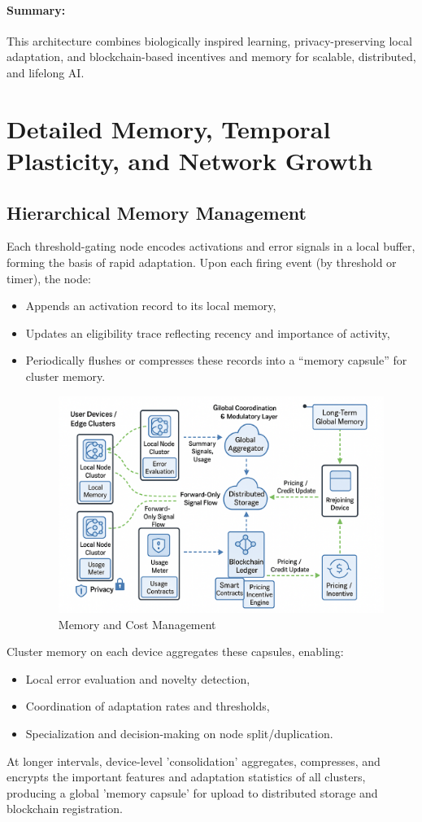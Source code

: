 \documentclass[11pt]{article}
\begin{document}
\paragraph{Summary:}  
This architecture combines biologically inspired learning, privacy-preserving local adaptation, and blockchain-based incentives and memory for scalable, distributed, and lifelong AI.


\section{Detailed Memory, Temporal Plasticity, and Network Growth}

\subsection{Hierarchical Memory Management}
Each threshold-gating node encodes activations and error signals in a local buffer, forming the basis of rapid adaptation. Upon each firing event (by threshold or timer), the node:
\begin{itemize}
    \item Appends an activation record to its local memory,
    \item Updates an eligibility trace reflecting recency and importance of activity,
    \item Periodically flushes or compresses these records into a “memory capsule” for cluster memory.
    \begin{figure}
        \centering
        \includegraphics[width=0.6\linewidth]{architecture_diagrams/37f16f0b-ac7a-44b5-8a94-e48c92587896.png}
        \caption{Memory and Cost Management}
        \label{fig:memory-and-cost-management}
    \end{figure}
\end{itemize}
Cluster memory on each device aggregates these capsules, enabling:
\begin{itemize}
    \item Local error evaluation and novelty detection,
    \item Coordination of adaptation rates and thresholds,
    \item Specialization and decision-making on node split/duplication.
\end{itemize}
At longer intervals, device-level 'consolidation' aggregates, compresses, and encrypts the important features and adaptation statistics of all clusters, producing a global 'memory capsule' for upload to distributed storage and blockchain registration.
\end{document}
